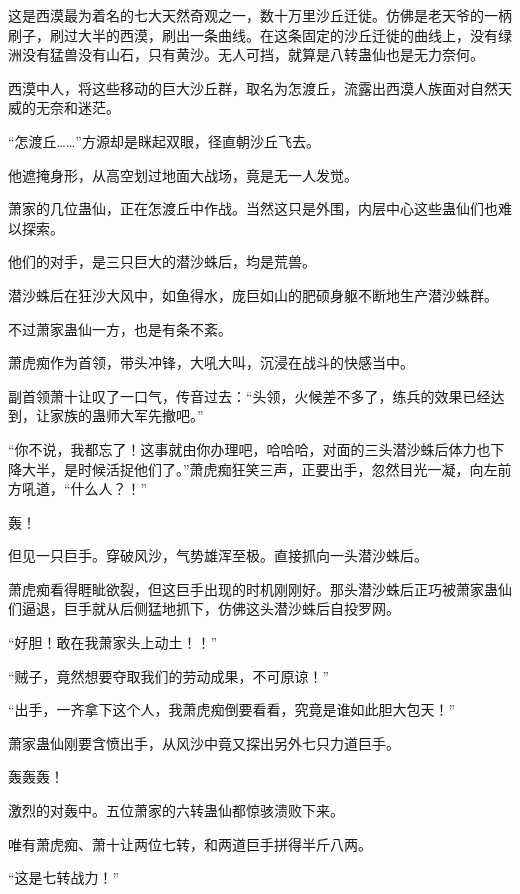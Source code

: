 
\begin{this_body}

这是西漠最为着名的七大天然奇观之一，数十万里沙丘迁徙。仿佛是老天爷的一柄刷子，刷过大半的西漠，刷出一条曲线。在这条固定的沙丘迁徙的曲线上，没有绿洲没有猛兽没有山石，只有黄沙。无人可挡，就算是八转蛊仙也是无力奈何。

西漠中人，将这些移动的巨大沙丘群，取名为怎渡丘，流露出西漠人族面对自然天威的无奈和迷茫。

“怎渡丘……”方源却是眯起双眼，径直朝沙丘飞去。

他遮掩身形，从高空划过地面大战场，竟是无一人发觉。

萧家的几位蛊仙，正在怎渡丘中作战。当然这只是外围，内层中心这些蛊仙们也难以探索。

他们的对手，是三只巨大的潜沙蛛后，均是荒兽。

潜沙蛛后在狂沙大风中，如鱼得水，庞巨如山的肥硕身躯不断地生产潜沙蛛群。

不过萧家蛊仙一方，也是有条不紊。

萧虎痴作为首领，带头冲锋，大吼大叫，沉浸在战斗的快感当中。

副首领萧十让叹了一口气，传音过去：“头领，火候差不多了，练兵的效果已经达到，让家族的蛊师大军先撤吧。”

“你不说，我都忘了！这事就由你办理吧，哈哈哈，对面的三头潜沙蛛后体力也下降大半，是时候活捉他们了。”萧虎痴狂笑三声，正要出手，忽然目光一凝，向左前方吼道，“什么人？！”

轰！

但见一只巨手。穿破风沙，气势雄浑至极。直接抓向一头潜沙蛛后。

萧虎痴看得睚眦欲裂，但这巨手出现的时机刚刚好。那头潜沙蛛后正巧被萧家蛊仙们逼退，巨手就从后侧猛地抓下，仿佛这头潜沙蛛后自投罗网。

“好胆！敢在我萧家头上动土！！”

“贼子，竟然想要夺取我们的劳动成果，不可原谅！”

“出手，一齐拿下这个人，我萧虎痴倒要看看，究竟是谁如此胆大包天！”

萧家蛊仙刚要含愤出手，从风沙中竟又探出另外七只力道巨手。

轰轰轰！

激烈的对轰中。五位萧家的六转蛊仙都惊骇溃败下来。

唯有萧虎痴、萧十让两位七转，和两道巨手拼得半斤八两。

“这是七转战力！”


\end{this_body}
